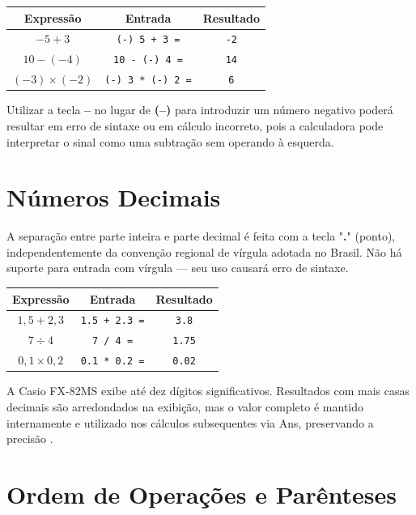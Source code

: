 \begin{center}
\begin{tabular}{|c|c|c|}
    \hline
    \textbf{Expressão} & \textbf{Entrada} & \textbf{Resultado} \\
    \hline
    $-5 + 3$ & \texttt{(-) 5 + 3 =} & \texttt{-2} \\
    $10 - (-4)$ & \texttt{10 - (-) 4 =}  & \texttt{14} \\
    $(-3) \times (-2)$ & \texttt{(-) 3 * (-) 2 =} & \texttt{6}  \\
    \hline
\end{tabular}
\end{center}

Utilizar a tecla \textbf{--} no lugar de \textbf{(--)} para introduzir um número negativo poderá resultar em erro de sintaxe ou em cálculo incorreto, pois a calculadora pode interpretar o sinal como uma subtração sem operando à esquerda.

\section{Números Decimais}

A separação entre parte inteira e parte decimal é feita com a tecla "\textbf{.}" (ponto), independentemente da convenção regional de vírgula adotada no Brasil. Não há suporte para entrada com vírgula — seu uso causará erro de sintaxe.

\begin{center}
\begin{tabular}{|c|c|c|}
    \hline
    \textbf{Expressão} & \textbf{Entrada} & \textbf{Resultado} \\
    \hline
    $1{,}5 + 2{,}3$ & \texttt{1.5 + 2.3 =} & \texttt{3.8} \\
    $7 \div 4$ & \texttt{7 / 4 =} & \texttt{1.75} \\
    $0{,}1 \times 0{,}2$ & \texttt{0.1 * 0.2 =} & \texttt{0.02} \\
    \hline
\end{tabular}
\end{center}

A Casio FX-82MS exibe até dez dígitos significativos. Resultados com mais casas decimais são arredondados na exibição, mas o valor completo é mantido internamente e utilizado nos cálculos subsequentes via Ans, preservando a precisão \cite{casio2004}.

\section{Ordem de Operações e Parênteses}

